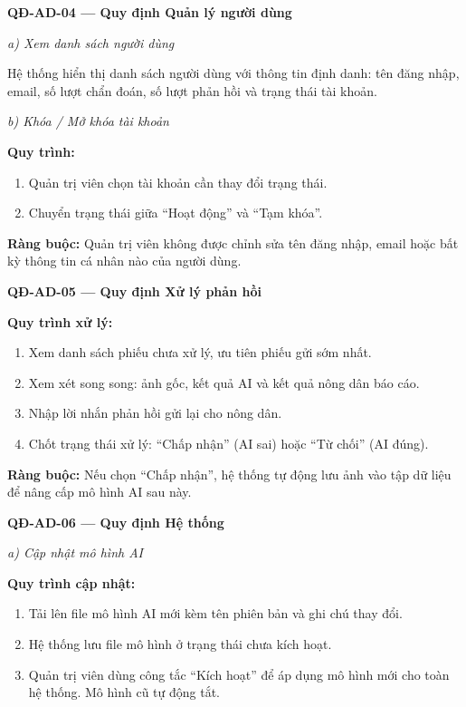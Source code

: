 ﻿\documentclass[12pt,a4paper]{article}
\begin{document}
\vspace{0.3cm}
\noindent\textbf{QĐ-AD-04 --- Quy định Quản lý người dùng}

\noindent\textit{a) Xem danh sách người dùng}

Hệ thống hiển thị danh sách người dùng với thông tin định danh: tên đăng nhập, email, số lượt chẩn đoán, số lượt phản hồi và trạng thái tài khoản.

\noindent\textit{b) Khóa / Mở khóa tài khoản}

\noindent\textbf{Quy trình:}
\begin{enumerate}
    \item Quản trị viên chọn tài khoản cần thay đổi trạng thái.
    \item Chuyển trạng thái giữa ``Hoạt động'' và ``Tạm khóa''.
\end{enumerate}
\noindent\textbf{Ràng buộc:} Quản trị viên không được chỉnh sửa tên đăng nhập, email hoặc bất kỳ thông tin cá nhân nào của người dùng.

\vspace{0.3cm}
\noindent\textbf{QĐ-AD-05 --- Quy định Xử lý phản hồi}

\noindent\textbf{Quy trình xử lý:}
\begin{enumerate}
    \item Xem danh sách phiếu chưa xử lý, ưu tiên phiếu gửi sớm nhất.
    \item Xem xét song song: ảnh gốc, kết quả AI và kết quả nông dân báo cáo.
    \item Nhập lời nhắn phản hồi gửi lại cho nông dân.
    \item Chốt trạng thái xử lý: ``Chấp nhận'' (AI sai) hoặc ``Từ chối'' (AI đúng).
\end{enumerate}
\noindent\textbf{Ràng buộc:} Nếu chọn ``Chấp nhận'', hệ thống tự động lưu ảnh vào tập dữ liệu để nâng cấp mô hình AI sau này.

\vspace{0.3cm}
\noindent\textbf{QĐ-AD-06 --- Quy định Hệ thống}

\noindent\textit{a) Cập nhật mô hình AI}

\noindent\textbf{Quy trình cập nhật:}
\begin{enumerate}
    \item Tải lên file mô hình AI mới kèm tên phiên bản và ghi chú thay đổi.
    \item Hệ thống lưu file mô hình ở trạng thái chưa kích hoạt.
    \item Quản trị viên dùng công tắc ``Kích hoạt'' để áp dụng mô hình mới cho toàn hệ thống. Mô hình cũ tự động tắt.
\end{enumerate}
\end{document}
